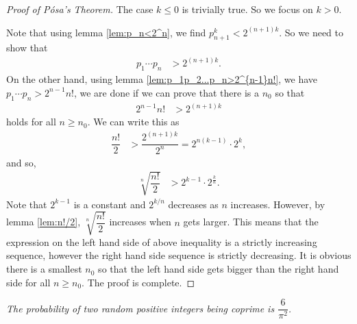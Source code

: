\documentclass{subfiles}
\begin{document}
	\begin{proof}[Proof of P\'osa's Theorem]
		The case $k\leq0$ is trivially true. So we focus on $k>0$. 
		
		Note that using lemma \eqref{lem:p_n<2^n}, we find $p_{n+1}^k<2^{(n+1)k}$. So we need to show that
			\begin{align*}
				p_1\cdots p_n & > 2^{(n+1)k}.
			\end{align*}
		On the other hand, using lemma \eqref{lem:p_1p_2...p_n>2^{n-1}n!}, we have $p_1\cdots p_n > 2^{n-1}n!$, we are done if we can prove that there is a $n_0$ so that
			\begin{align*}
				2^{n-1}n! & >2^{(n+1)k}
			\end{align*}
		holds for all $n\geq n_0$. We can write this as
			\begin{align*}
				\dfrac{n!}{2} & >\dfrac{2^{(n+1)k}}{2^n} =2^{n(k-1)}\cdot2^k,
			\end{align*}
		and so,
			\begin{align*}
				\sqrt[n]{\dfrac{n!}{2}}&>2^{k-1}\cdot2^{\frac{k}{n}}.
			\end{align*}
		Note that $2^{k-1}$ is a constant and $2^{k/n}$ decreases as $n$ increases. However, by lemma \eqref{lem:n!/2}, $\sqrt[n]{\dfrac{n!}{2}}$ increases when $n$ gets larger. This means that the expression on the left hand side of above inequality is a strictly increasing sequence, however the right hand side sequence is strictly decreasing. It is obvious there is a smallest $n_0$ so that the left hand side gets bigger than the right hand side for all $n\geq n_0$. The proof is complete.
	\end{proof}
	
	\begin{theorem}\slshape
		The probability of two random positive integers being coprime is $\dfrac{6}{\pi^2}$.
	\end{theorem}
	
\end{document}
